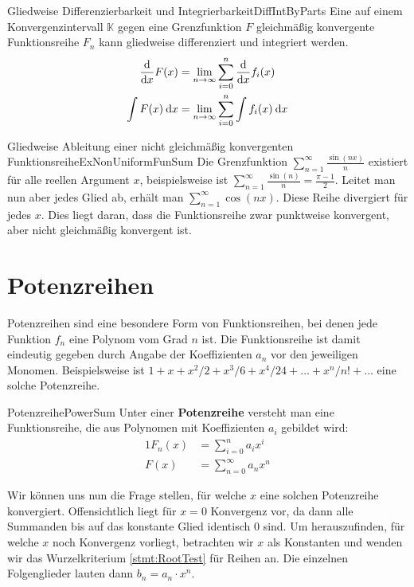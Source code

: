 \begin{statement}{Gliedweise Differenzierbarkeit und Integrierbarkeit}{DiffIntByParts}
    Eine auf einem Konvergenzintervall $\mathbb{K}$ gegen eine Grenzfunktion $F$ gleichmäßig konvergente Funktionsreihe $F_n$ kann gliedweise differenziert und integriert werden.
    \begin{alignat*}{1}
        \frac{\mathrm{d}{}}{\mathrm{d}{x}} F(x)      &= \lim\limits_{n\to\infty} \sum\limits_{i=0}^n \frac{\mathrm{d}{}}{\mathrm{d}{x}} f_i(x) \\
        \int F(x) \:\mathrm{d}{x} &= \lim\limits_{n\to\infty} \sum\limits_{i=0}^n \int f_i(x) \:\mathrm{d}{x}
    \end{alignat*}
\end{statement}

\begin{example}{Gliedweise Ableitung einer nicht gleichmäßig konvergenten Funktionsreihe}{ExNonUniformFunSum}
    Die Grenzfunktion $\sum\limits_{n=1}^\infty \frac{\sin(nx)}{n}$ existiert für alle reellen Argument $x$, beispielsweise ist $\sum\limits_{n=1}^\infty \frac{\sin(n)}{n} = \frac{\pi-1}{2}$. Leitet man nun aber jedes Glied ab, erhält man $\sum\limits_{n=1}^\infty \cos(nx)$. Diese Reihe divergiert für jedes $x$. Dies liegt daran, dass die Funktionsreihe zwar punktweise konvergent, aber nicht gleichmäßig konvergent ist.
\end{example}

\section{Potenzreihen}

Potenzreihen sind eine besondere Form von Funktionsreihen, bei denen jede Funktion $f_n$ eine Polynom vom Grad $n$ ist. Die Funktionsreihe ist damit eindeutig gegeben durch Angabe der Koeffizienten $a_n$ vor den jeweiligen Monomen. Beispielsweise ist $1+x+x^2/2+x^3/6+x^4/24 + \dots + x^n/n! + \dots$ eine solche Potenzreihe.

\begin{definition}{Potenzreihe}{PowerSum}
    Unter einer \textbf{Potenzreihe} versteht man eine Funktionsreihe, die aus Polynomen mit Koeffizienten $a_i$ gebildet wird:
    \begin{alignat*}{1}
        F_n(x) &= \sum\limits_{i=0}^n a_i x^i \\
        F(x)   &= \sum\limits_{n=0}^\infty a_n x^n
    \end{alignat*}
\end{definition}

Wir können uns nun die Frage stellen, für welche $x$ eine solchen Potenzreihe konvergiert. Offensichtlich liegt für $x=0$ Konvergenz vor, da dann alle Summanden bis auf das konstante Glied identisch $0$ sind. Um herauszufinden, für welche $x$ noch Konvergenz vorliegt, betrachten wir $x$ als Konstanten und wenden wir das Wurzelkriterium \ref{stmt:RootTest} für Reihen an. Die einzelnen Folgenglieder lauten dann $b_n = a_n \cdot x^n$.

